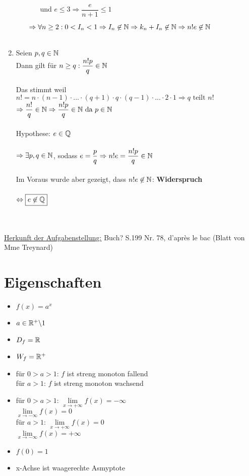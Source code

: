 \begin{Beweis}
\begin{enumerate}
\begin{enumerate}
\begin{itemize}
					und $e\leq3 \Rightarrow \dfrac{e}{n+1}\leq 1$\\
		\end{itemize}
$\Rightarrow\forall n\geq2:0<I_n<1\Rightarrow I_n\not\in\mathbb{N}\Rightarrow k_n+I_n\not\in\mathbb{N}\Rightarrow n!e\not\in\mathbb{N}$\\\\\end{enumerate}
\item Seien $p, q \in\mathbb{N}$\\
Dann gilt für $n\geq q:\dfrac{n!p}{q}\in\mathbb{N}$\\\\
Das stimmt weil $n!=n\cdot(n-1)\cdot...\cdot(q+1)\cdot q\cdot(q-1)\cdot...\cdot2\cdot1\Rightarrow q \text{ teilt }n!$
$\Rightarrow \dfrac{n!}{q}\in\mathbb{N}\Rightarrow\dfrac{n!p}{q}\in\mathbb{N}\text{ da }p\in\mathbb{N}$\\\\
Hypothese: $e\in\mathbb{Q}$\\\\
$\Rightarrow \exists p,q \in\mathbb{N}$, sodass $e=\dfrac{p}{q}\\
\Rightarrow n!e=\dfrac{n!p}{q}\in\mathbb{N}$\\\\
Im Voraus wurde aber gezeigt, dass $n!e\not\in\mathbb{N}$: \textbf{Widerspruch}\\\\
$\Leftrightarrow \boxed{e\not\in\mathbb{Q}}$ \heartsuit\\\\\\
\end{enumerate}
\underline{Herkunft der Aufgabenstellung:} Buch? S.199 Nr. 78, d'après le bac (Blatt von Mme Treynard)
\end{Beweis}

\section{Eigenschaften}
		

\begin{itemize}
\item$f(x)=a^x$
\item$a\in\mathbb{R}^+\backslash 1$
\item$D_f=\mathbb{R}$
\item$W_f=\mathbb{R}^+$
\item für $0>a>1$: $f$ ist streng monoton fallend\\
für $a>1$: $f$ ist streng monoton wachsend
\item für $0>a>1$: $\lim\limits_{x\to +\infty}f(x)=-\infty$\\
			$\lim\limits_{x\to -\infty}f(x)=0$\\
für $a>1$: $\lim\limits_{x\to +\infty}f(x)=0$\\
	        $\lim\limits_{x\to -\infty}f(x)=+\infty$
\item $f(0)=1$
\item x-Achse ist waagerechte Asmyptote

\end{itemize}

